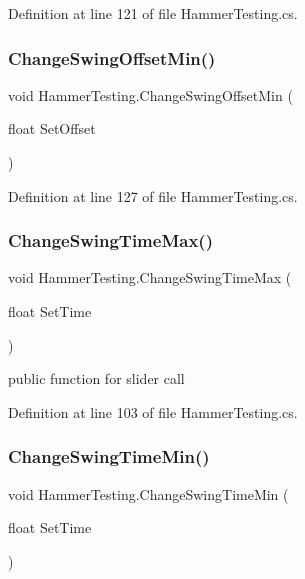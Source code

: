 Definition at line 121 of file Hammer\+Testing.\+cs.

\mbox{\label{class_hammer_testing_a9abdafe3c6675aff4094363495f7251e}} 
\subsubsection{\texorpdfstring{Change\+Swing\+Offset\+Min()}{ChangeSwingOffsetMin()}}
{\footnotesize\ttfamily void Hammer\+Testing.\+Change\+Swing\+Offset\+Min (\begin{DoxyParamCaption}\item[{float}]{Set\+Offset }\end{DoxyParamCaption})}



Definition at line 127 of file Hammer\+Testing.\+cs.

\mbox{\label{class_hammer_testing_a895ff7ed709508ccb4b6c500d073f8b6}} 
\subsubsection{\texorpdfstring{Change\+Swing\+Time\+Max()}{ChangeSwingTimeMax()}}
{\footnotesize\ttfamily void Hammer\+Testing.\+Change\+Swing\+Time\+Max (\begin{DoxyParamCaption}\item[{float}]{Set\+Time }\end{DoxyParamCaption})}



public function for slider call 



Definition at line 103 of file Hammer\+Testing.\+cs.

\mbox{\label{class_hammer_testing_a6927a1845828bb873e10168e6de15ee9}} 
\subsubsection{\texorpdfstring{Change\+Swing\+Time\+Min()}{ChangeSwingTimeMin()}}
{\footnotesize\ttfamily void Hammer\+Testing.\+Change\+Swing\+Time\+Min (\begin{DoxyParamCaption}\item[{float}]{Set\+Time }\end{DoxyParamCaption})}



